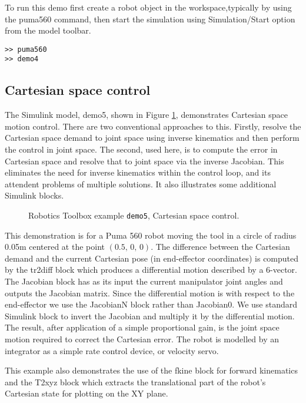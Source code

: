 \documentclass{article}
\newcommand{\var}[1]{{\vtt #1}}
\begin{document}
To run this demo first create a robot object in
the workspace,typically by using the \var{puma560} command, then start
the simulation using Simulation/Start option from the model toolbar.
\begin{verbatim}
>> puma560
>> demo4
\end{verbatim}

\subsection{Cartesian space control}
The Simulink model, \var{demo5}, shown in Figure \ref{fig:demo5}, demonstrates
Cartesian space motion control.
There are two conventional approaches to 
this. Firstly, resolve the Cartesian space demand to joint space using
inverse kinematics and then perform the control in joint space.  The second,
used here, is to compute the error in Cartesian space and resolve that to
joint space via the inverse Jacobian.  This eliminates the need for inverse
kinematics within the control loop, and its attendent problems of multiple
solutions.  It also illustrates some additional Simulink blocks.

\begin{figure}[b]
\caption{Robotics Toolbox example \texttt{demo5}, Cartesian space
control.}\label{fig:demo5}
\end{figure}

This demonstration is for a Puma 560
robot moving the tool in a circle of radius 0.05m centered at the point 
$(0.5,\, 0,\, 0)$.  The difference between the Cartesian demand and the current 
Cartesian pose (in end-effector coordinates) is computed by the 
\var{tr2diff} block which produces a 
differential motion described by a 6-vector.
The Jacobian block has as its input the current manipulator joint angles and
outputs the Jacobian matrix.  Since the differential motion is with respect
to the end-effector we use the JacobianN block rather than Jacobian0.
We use standard Simulink block to invert the Jacobian and multiply it by the
differential motion.  The result, after application of a simple 
proportional gain, is the joint space motion required to 
correct the Cartesian error.
The robot is modelled by an integrator as a simple rate control device, or
velocity servo.

This example also demonstrates the use of the \var{fkine} block for forward
kinematics and the \var{T2xyz} block which extracts the translational part
of the robot's Cartesian state for plotting on the XY plane.
\end{document}
